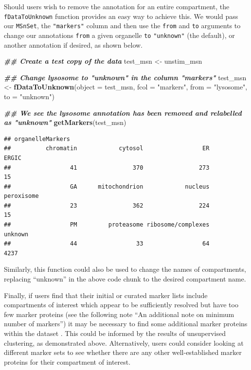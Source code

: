 \documentclass[9pt,a4paper,]{extarticle}
\newenvironment{Shaded}{\begin{snugshade}}{\end{snugshade}}
\newcommand{\AttributeTok}[1]{\textcolor[rgb]{0.13,0.29,0.53}{#1}}
\newcommand{\DocumentationTok}[1]{\textcolor[rgb]{0.56,0.35,0.01}{\textbf{\textit{#1}}}}
\newcommand{\FunctionTok}[1]{\textcolor[rgb]{0.13,0.29,0.53}{\textbf{#1}}}
\newcommand{\NormalTok}[1]{#1}
\newcommand{\OtherTok}[1]{\textcolor[rgb]{0.56,0.35,0.01}{#1}}
\newcommand{\StringTok}[1]{\textcolor[rgb]{0.31,0.60,0.02}{#1}}
\begin{document}
Should users wish to remove the annotation for an entire compartment, the
\texttt{fDataToUnknown} function provides an easy way to achieve this. We would
pass our \texttt{MSnSet}, the \texttt{"markers"} column and then use the \texttt{from} and \texttt{to}
arguments to change our annotations \texttt{from} a given organelle \texttt{to} \texttt{"unknown"}
(the default), or another annotation if desired, as shown below.

\begin{Shaded}
\begin{Highlighting}[]
\DocumentationTok{\#\# Create a test copy of the data}
\NormalTok{test\_msn }\OtherTok{\textless{}{-}}\NormalTok{ unstim\_msn}

\DocumentationTok{\#\# Change lysosome to "unknown" in the column "markers"}
\NormalTok{test\_msn }\OtherTok{\textless{}{-}} \FunctionTok{fDataToUnknown}\NormalTok{(}\AttributeTok{object =}\NormalTok{ test\_msn, }\AttributeTok{fcol =} \StringTok{"markers"}\NormalTok{, }
                           \AttributeTok{from =} \StringTok{"lysosome"}\NormalTok{, }\AttributeTok{to =} \StringTok{"unknown"}\NormalTok{)}

\DocumentationTok{\#\# We see the lysosome annotation has been removed and relabelled as "unknown"}
\FunctionTok{getMarkers}\NormalTok{(test\_msn)}
\end{Highlighting}
\end{Shaded}

\begin{verbatim}
## organelleMarkers
##          chromatin            cytosol                 ER              ERGIC 
##                 41                370                273                 15 
##                 GA      mitochondrion            nucleus         peroxisome 
##                 23                362                224                 15 
##                 PM         proteasome ribosome/complexes            unknown 
##                 44                 33                 64               4237
\end{verbatim}

Similarly, this function could also be used to change the names of
compartments, replacing ``unknown'' in the above code chunk to the desired
compartment name.

Finally, if users find that their initial or curated marker lists include
compartments of interest which appear to be sufficiently resolved but have too
few marker proteins (see the following note ``An additional note on minimum
number of markers'') it may be necessary to find some additional marker proteins
within the dataset . This could be informed by the results of unsupervised
clustering, as demonstrated above. Alternatively, users could consider looking
at different marker sets to see whether there are any other well-established
marker proteins for their compartment of interest.
\end{document}
